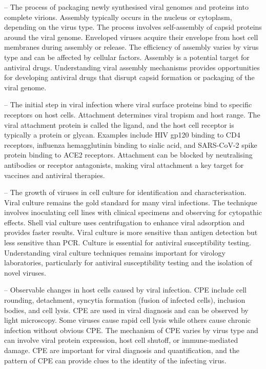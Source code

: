 -- The process of packaging newly synthesised viral genomes and proteins into complete virions. Assembly typically occurs in the nucleus or cytoplasm, depending on the virus type. The process involves self-assembly of capsid proteins around the viral genome. Enveloped viruses acquire their envelope from host cell membranes during assembly or release. The efficiency of assembly varies by virus type and can be affected by cellular factors. Assembly is a potential target for antiviral drugs. Understanding viral assembly mechanisms provides opportunities for developing antiviral drugs that disrupt capsid formation or packaging of the viral genome.

-- The initial step in viral infection where viral surface proteins bind to specific receptors on host cells. Attachment determines viral tropism and host range. The viral attachment protein is called the ligand, and the host cell receptor is typically a protein or glycan. Examples include HIV gp120 binding to CD4 receptors, influenza hemagglutinin binding to sialic acid, and SARS-CoV-2 spike protein binding to ACE2 receptors. Attachment can be blocked by neutralising antibodies or receptor antagonists, making viral attachment a key target for vaccines and antiviral therapies.

-- The growth of viruses in cell culture for identification and characterisation. Viral culture remains the gold standard for many viral infections. The technique involves inoculating cell lines with clinical specimens and observing for cytopathic effects. Shell vial culture uses centrifugation to enhance viral adsorption and provides faster results. Viral culture is more sensitive than antigen detection but less sensitive than PCR. Culture is essential for antiviral susceptibility testing. Understanding viral culture techniques remains important for virology laboratories, particularly for antiviral susceptibility testing and the isolation of novel viruses.

-- Observable changes in host cells caused by viral infection. CPE include cell rounding, detachment, syncytia formation (fusion of infected cells), inclusion bodies, and cell lysis. CPE are used in viral diagnosis and can be observed by light microscopy. Some viruses cause rapid cell lysis while others cause chronic infection without obvious CPE. The mechanism of CPE varies by virus type and can involve viral protein expression, host cell shutoff, or immune-mediated damage. CPE are important for viral diagnosis and quantification, and the pattern of CPE can provide clues to the identity of the infecting virus.

